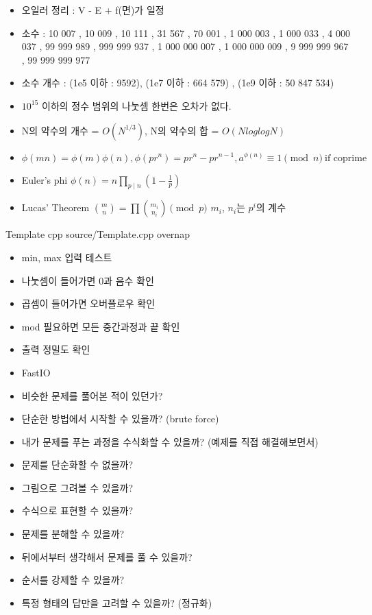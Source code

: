 \documentclass[landscape, 10pt, a4paper, oneside, twocolumn]{extarticle}
\begin{document}
\begin{itemize}
\item 오일러 정리 : V - E + f(면)가 일정
\item 소수 : 10 007 , 10 009 , 10 111 , 31 567 , 70 001 , 1 000 003 , 1 000 033 , 4 000 037 , 99 999 989 , 999 999 937 , 1 000 000 007 , 1 000 000 009 , 9 999 999 967 , 99 999 999 977
\item 소수 개수 : (1e5 이하 : 9592), (1e7 이하 : 664 579) , (1e9 이하 : 50 847 534) 
\item $10^{15}$ 이하의 정수 범위의 나눗셈 한번은 오차가 없다.
\item N의 약수의 개수 = $O(N^{1/3})$, N의 약수의 합 = $O(NloglogN)$
\item $\phi(mn) = \phi(m) \phi(n) , \phi(pr^n) = pr^n - pr^{n-1} , a^{\phi(n)} \equiv 1 \pmod{n} \ \text{if coprime}$
\end{itemize}

\begin{itemize}  %
\item Euler's phi $\phi (n)=n\prod _{p\mid n}\left(1-{\frac {1}{p}}\right)$
\item Lucas' Theorem $\binom{m}{n}=\prod\binom{m_i}{n_i} \pmod p$ $m_i$, $n_i$는 $p^i$의 계수
\end{itemize}

\Algorithm
{Template}
{}
{}
{cpp}
{source/Template.cpp}
{overnap}


\begin{itemize}
\item min, max 입력 테스트
\item 나눗셈이 들어가면 0과 음수 확인
\item 곱셈이 들어가면 오버플로우 확인
\item mod 필요하면 모든 중간과정과 끝 확인
\item 출력 정밀도 확인
\item FastIO
\end{itemize}


\begin{itemize}
\item 비슷한 문제를 풀어본 적이 있던가?
\item 단순한 방법에서 시작할 수 있을까? (brute force)
\item 내가 문제를 푸는 과정을 수식화할 수 있을까? (예제를 직접 해결해보면서)
\item 문제를 단순화할 수 없을까?
\item 그림으로 그려볼 수 있을까?
\item 수식으로 표현할 수 있을까?
\item 문제를 분해할 수 있을까?
\item 뒤에서부터 생각해서 문제를 풀 수 있을까?
\item 순서를 강제할 수 있을까?
\item 특정 형태의 답만을 고려할 수 있을까? (정규화)
\end{itemize}
\end{document}
